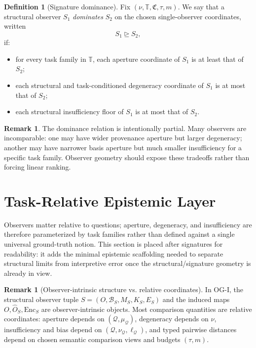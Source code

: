 \documentclass[11pt,twoside]{article}
\theoremstyle{definition}
\newtheorem{definition}[theorem]{Definition}
\newtheorem{remark}[theorem]{Remark}
\newcommand{\Enc}{\mathrm{Enc}}
\newcommand{\TaskBundle}{\mathbb{T}}
\begin{document}
\begin{definition}[Signature dominance]
\label{def:signature-dominance}
Fix \((\nu,\TaskBundle,\mathfrak{C},\tau,m)\). We say that a structural observer \(S_1\) \emph{dominates} \(S_2\) on the chosen single-observer coordinates, written
\[
  S_1 \trianglerighteq S_2,
\]
if:
\begin{itemize}[leftmargin=*]
  \item for every task family in \(\TaskBundle\), each aperture coordinate of \(S_1\) is at least that of \(S_2\);
  \item each structural and task-conditioned degeneracy coordinate of \(S_1\) is at most that of \(S_2\);
  \item each structural insufficiency floor of \(S_1\) is at most that of \(S_2\).
\end{itemize}
\end{definition}

\begin{remark}
\label{rem:signature-dominance}
The dominance relation is intentionally partial. Many observers are incomparable: one may have wider provenance aperture but larger degeneracy; another may have narrower basis aperture but much smaller insufficiency for a specific task family. Observer geometry should expose these tradeoffs rather than forcing linear ranking.
\end{remark}
\section{Task-Relative Epistemic Layer}
\label{sec:epistemic-layer}

Observers matter relative to questions; aperture, degeneracy, and insufficiency are therefore parameterized by task families rather than defined against a single universal ground-truth notion. This section is placed after signatures for readability: it adds the minimal epistemic scaffolding needed to separate structural limits from interpretive error once the structural/signature geometry is already in view.

\begin{remark}[Observer-intrinsic structure vs. relative coordinates]
\label{rem:intrinsic-vs-relative}
In OG-I, the structural observer tuple \(S=(O,\mathcal{B}_S,M_S,K_S,E_S)\) and the induced maps \(O,\widehat{O}_S,\Enc_S\) are observer-intrinsic objects. Most comparison quantities are relative coordinates: aperture depends on \((\mathcal{Q},\mu_{\mathcal{Q}})\), degeneracy depends on \(\nu\), insufficiency and bias depend on \((\mathcal{Q},\nu_{\mathcal{Q}},\ell_{\mathcal{Q}})\), and typed pairwise distances depend on chosen semantic comparison views and budgets \((\tau,m)\).
\end{remark}
\end{document}

